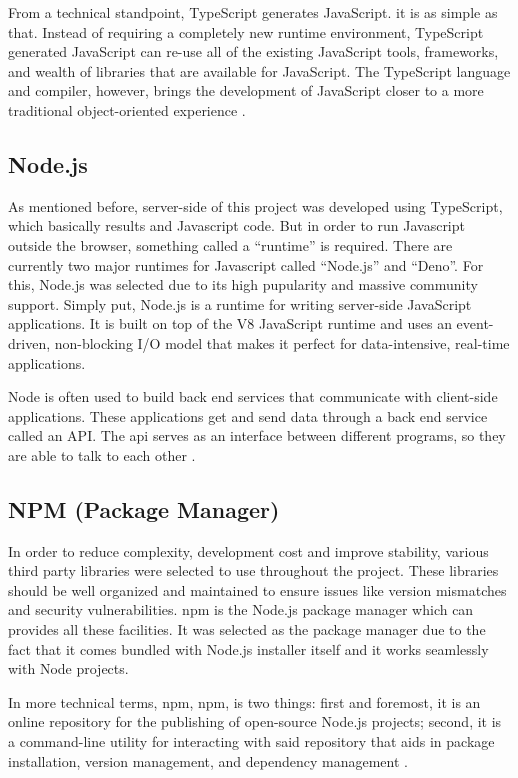 \documentclass[12pt]{report}
\begin{document}
From a technical standpoint, TypeScript generates JavaScript. it is as simple as that. Instead of requiring a completely new runtime environment, TypeScript generated JavaScript can re-use all of the existing JavaScript tools, frameworks, and wealth of libraries that are available for JavaScript. The TypeScript language and compiler, however, brings the development of JavaScript closer to a more traditional object-oriented experience \cite{rozentals_2015_typescript}.

\subsection{Node.js}
As mentioned before, server-side of this project was developed using TypeScript, which basically results and Javascript code. But in order to run Javascript outside the browser, something called a ``runtime'' is required. There are currently two major runtimes for Javascript called ``Node.js'' and ``Deno''. For this, Node.js was selected due to its high pupularity and massive community support. Simply put, Node.js is a runtime for writing server-side JavaScript applications. It is built on top of the V8 JavaScript runtime and uses an event-driven, non-blocking I/O model that makes it perfect for data-intensive, real-time applications.

Node is often used to build back end services that communicate with client-side applications. These applications get and send data through a back end service called an API. The \acrshort{api} serves as an interface between different programs, so they are able to talk to each other \cite{teixeira_2013_nodejs}.

\subsection{NPM (Package Manager)}
In order to reduce complexity, development cost and improve stability, various third party libraries were selected to use throughout the project. These libraries should be well organized and maintained to ensure issues like version mismatches and security vulnerabilities. \acrshort{npm} is the Node.js package manager which can provides all these facilities. It was selected as the package manager due to the fact that it comes bundled with Node.js installer itself and it works seamlessly with Node projects.

In more technical terms, \acrshort{npm}, \acrlong{npm}, is two things: first and foremost, it is an online repository for the publishing of open-source Node.js projects; second, it is a command-line utility for interacting with said repository that aids in package installation, version management, and dependency management \cite{teixeira_2013_nodejs}.
\end{document}
